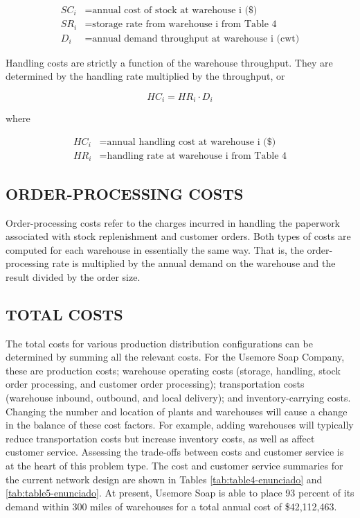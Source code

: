 \documentclass[12pt,a4paper]{article}
\begin{document}
\begin{align*}
    SC_{i} &= \text{annual cost of stock at warehouse i (\$)} \\
    SR_{i}  &= \text{storage rate from warehouse i from Table 4} \\
    D_{i}   &= \text{annual demand throughput at warehouse i (cwt)}
\end{align*}

Handling costs are strictly a function of the warehouse throughput.
They are determined by  the handling rate multiplied by the throughput, or

\begin{equation}
    HC_{i} = HR_{i} \cdot D_{i}
\end{equation}

where

\begin{align*}
    HC_{i}  &= \text{annual handling cost at warehouse i (\$)} \\
    HR_{i}  &= \text{handling rate at warehouse i from Table 4}
\end{align*}


\subsection{ORDER-PROCESSING COSTS}

Order-processing costs refer to the charges incurred in handling the paperwork associated with stock replenishment and customer orders.
Both types of costs are computed for each warehouse in essentially the same way.
That is, the order-processing rate is multiplied by the annual demand on the warehouse and the result divided by the order size.


\subsection{TOTAL COSTS}

The total costs for various production distribution configurations can be determined by summing all the relevant costs.
For the Usemore Soap Company, these are production costs; warehouse
operating costs (storage, handling, stock order processing, and customer order processing);
transportation costs (warehouse inbound, outbound, and local delivery); and inventory-carrying costs.
Changing the number and location of plants and warehouses will cause a
change in the balance of these cost factors.
For example, adding warehouses will typically reduce transportation costs but increase inventory costs, as well as affect customer service.
Assessing the trade-offs between costs and customer service is at the heart of this problem type.
The cost and customer service summaries for the current network design are shown in Tables \ref{tab:table4-enunciado} and \ref{tab:table5-enunciado}.
At present, Usemore Soap is able to place 93 percent of its demand within 300 miles of warehouses for a total annual cost of
\$42,112,463.
\end{document}
